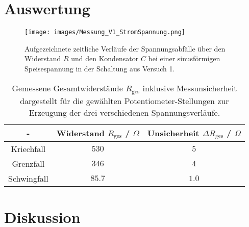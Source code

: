 \documentclass{article}
\begin{document}
\setcounter{totalnumber}{4}


\chead{}
\ohead{}
\cfoot{\thepage{} / \pageref{LastPage}}

\tableofcontents
\newpage

\section{Auswertung}

\begin{figure}[h!]
    \centering
    \texttt{[image: images/Messung\_V1\_StromSpannung.png]}
    \caption{Aufgezeichnete zeitliche Verläufe der Spannungsabfälle über den Widerstand $R$ und den Kondensator $C$ bei einer sinusförmigen Speisespannung in der Schaltung aus Versuch 1. }
    \label{fig:MessungKondensatorSpannung}
\end{figure}

\begin{table}[h]
    \centering
    \caption{Gemessene Gesamtwiderstände $R_\text{ges}$ inklusive Messunsicherheit dargestellt für die gewählten Potentiometer-Stellungen zur Erzeugung der drei verschiedenen Spannungsverläufe.}
    \label{tab:MessungenWiderstand}
    \begin{tabular}{c|c|c}
         - & \textbf{Widerstand} $R_\text{ges}$ / $\Omega$ & \textbf{Unsicherheit} $\Delta R_\text{ges}$ / $\Omega$ \\\hline
         Kriechfall &  $530$ & $5$ \\ 
         Grenzfall   &  $346$ & $4$ \\
         Schwingfall   &  $85.7$ & $1.0$ \\\hline
    \end{tabular}
\end{table}

\section{Diskussion}


\newpage
\listoffigures
\listoftables
\end{document}

